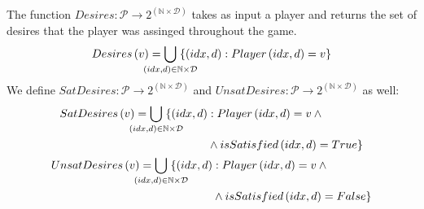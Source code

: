 \begin{definition} \ \\
  \label{desiresofplayer}
  The function $Desires : \mathcal{P} \rightarrow 2^{\left(\mathbb{N} \times
  \mathcal{D}\right)}$ takes as input a player and returns the set of desires that the
  player was assinged throughout the game.
  \begin{equation*}
    Desires\left(v\right) = \bigcup\limits_{\mathclap{\left(idx, d\right) \in \mathbb{N}
    \times \mathcal{D}}} \; \{\left(idx, d\right) : Player\left(idx, d\right) = v\}
  \end{equation*}
  We define $SatDesires : \mathcal{P} \rightarrow 2^{\left(\mathbb{N} \times
  \mathcal{D}\right)}$ and $UnsatDesires : \mathcal{P} \rightarrow 2^{\left(\mathbb{N}
  \times \mathcal{D}\right)}$ as well:
  \begin{gather*}
    \begin{aligned}
      SatDesires\left(v\right) = \bigcup\limits_{\mathclap{\left(idx, d\right) \in
      \mathbb{N} \times \mathcal{D}}} \; \{\left(idx, d\right) &: Player\left(idx,
      d\right) = v \: \wedge \\ &\wedge isSatisfied\left(idx, d\right) = True\}
    \end{aligned} \\
    \begin{aligned}
      UnsatDesires\left(v\right) = \bigcup\limits_{\mathclap{\left(idx, d\right) \in
      \mathbb{N} \times \mathcal{D}}} \; \{\left(idx, d\right) &: Player\left(idx,
      d\right) = v \: \wedge \\ &\wedge isSatisfied\left(idx, d\right) = False\}
    \end{aligned}
  \end{gather*}
\end{definition}
